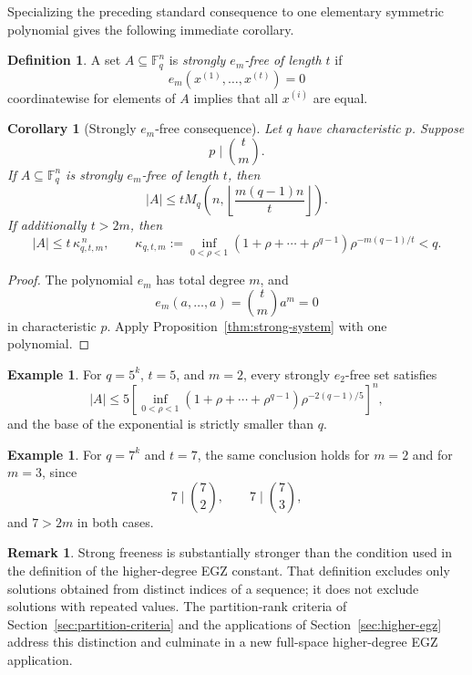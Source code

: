 \documentclass[10pt,a4paper]{amsart}
\newtheorem{corollary}[theorem]{Corollary}
\theoremstyle{definition}
\newtheorem{definition}[theorem]{Definition}
\newtheorem{remark}[theorem]{Remark}
\newtheorem{example}[theorem]{Example}
\newcommand{\F}{\mathbb F}
\newcommand{\1}{\mathbf 1}
\begin{document}
Specializing the preceding standard consequence to one elementary symmetric polynomial gives the following immediate corollary.

\begin{definition}
A set $A\subseteq\F_q^n$ is \emph{strongly $e_m$-free of length $t$} if
\[
 e_m(x^{(1)},\ldots,x^{(t)})=0
\]
coordinatewise for elements of $A$ implies that all $x^{(i)}$ are equal.
\end{definition}

\begin{corollary}[Strongly $e_m$-free consequence]\label{thm:strong-em}
Let $q$ have characteristic $p$.  Suppose
\[
 p\mid\binom tm.
\]
If $A\subseteq\F_q^n$ is strongly $e_m$-free of length $t$, then
\[
 |A|\le
 tM_q\left(n,\left\lfloor\frac{m(q-1)n}{t}\right\rfloor\right).
\]
If additionally $t>2m$, then
\[
 |A|\le t\,\kappa_{q,t,m}^{\,n},
\qquad
 \kappa_{q,t,m}:=
 \inf_{0<\rho<1}
 (1+\rho+\cdots+\rho^{q-1})
 \rho^{-m(q-1)/t}<q.
\]
\end{corollary}

\begin{proof}
The polynomial $e_m$ has total degree $m$, and
\[
 e_m(a,\ldots,a)=\binom tm a^m=0
\]
in characteristic $p$.  Apply Proposition~\ref{thm:strong-system} with one polynomial.
\end{proof}

\begin{example}
For $q=5^k$, $t=5$, and $m=2$, every strongly $e_2$-free set satisfies
\[
 |A|\le5\left[
 \inf_{0<\rho<1}(1+\rho+\cdots+\rho^{q-1})
 \rho^{-2(q-1)/5}
 \right]^n,
\]
and the base of the exponential is strictly smaller than $q$.
\end{example}

\begin{example}
For $q=7^k$ and $t=7$, the same conclusion holds for $m=2$ and for $m=3$, since
\[
 7\mid\binom72,\qquad7\mid\binom73,
\]
and $7>2m$ in both cases.
\end{example}

\begin{remark}
Strong freeness is substantially stronger than the condition used in the definition of the higher-degree EGZ constant.  That definition excludes only solutions obtained from distinct indices of a sequence; it does not exclude solutions with repeated values.  The partition-rank criteria of Section~\ref{sec:partition-criteria} and the applications of Section~\ref{sec:higher-egz} address this distinction and culminate in a new full-space higher-degree EGZ application.
\end{remark}
\end{document}
